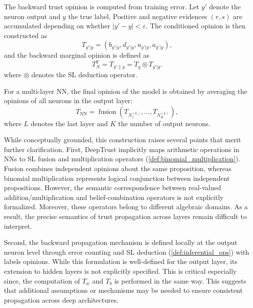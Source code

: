 The backward trust opinion is computed from training error. Let $y'$ denote the neuron output and $y$ the true label. Positive and negative evidences $(r,s)$ are accumulated depending on whether $|y' - y| < \varepsilon$. The conditioned opinion is then constructed as
\begin{equation}
    T_{y'|y} = (b_{y'|y}, d_{y'|y}, u_{y'|y}, a_{y'|y}),
\end{equation}
and the backward marginal opinion is defined as
\begin{equation}
    \label{eq:deeptrust_back}
    T^{Y}_N 
    = T_{y' \parallel y} 
    = T_y \circledcirc T_{y'|y}.
\end{equation}
where $\circledcirc$ denotes the \ac{SL} deduction operator. 

For a multi-layer \ac{NN}, the final opinion of the model is obtained 
by averaging the opinions of all neurons in the output layer:
\begin{equation}
    T_{\text{NN}} 
    = \operatorname{fusion}\!\left(
        T_{N^{(L)}_1}, \dots, T_{N^{(L)}_K}
    \right),
\end{equation}
where $L$ denotes the last layer and $K$ the number of output neurons.

\medskip

While conceptually grounded, this construction raises several points that merit further clarification. First, DeepTrust implicitly maps arithmetic operations in \acp{NN} to \ac{SL} fusion and multiplication operators (\cref{def:binomial_multiplication}). Fusion combines independent opinions about the same proposition, whereas binomial multiplication represents logical conjunction between independent propositions. However, the semantic correspondence between real-valued addition/multiplication and belief-combination operators is not explicitly formalized. Moreover, these operators belong to different algebraic domains. As a result, the precise semantics of trust propagation across layers remain difficult to interpret.

Second, the backward propagation mechanism is defined locally at the output neuron level through error counting and \ac{SL} deduction (\cref{def:inferential_ops}) with labels opinions. While this formulation is well-defined for the output layer, its extension to hidden layers is not explicitly specified. This is critical especially since, the computation of $T_w$ and $T_b$ is performed in the same way. This suggests that additional assumptions or mechanisms may be needed to ensure consistent propagation across deep architectures.

